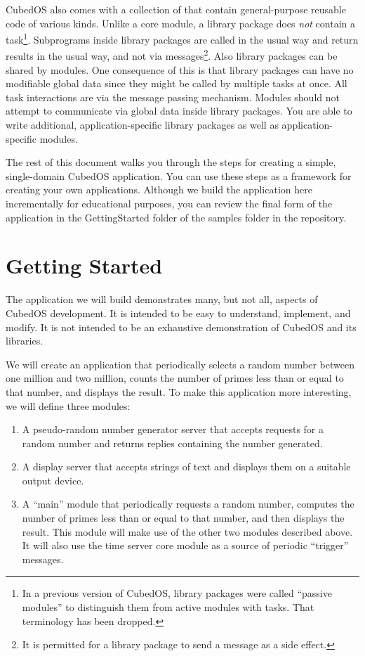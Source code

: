 \documentclass{scrreprt}
\begin{document}
CubedOS also comes with a collection of  that contain general-purpose reusable code of various kinds. Unlike a core module, a library package does \emph{not} contain a task\footnote{In a previous version of CubedOS, library packages were called ``passive modules'' to distinguish them from active modules with tasks. That terminology has been dropped.}. Subprograms inside library packages are called in the usual way and return results in the usual way, and not via messages\footnote{It is permitted for a library package to send a message as a side effect.}. Also library packages can be shared by modules. One consequence of this is that library packages can have no modifiable global data since they might be called by multiple tasks at once. All task interactions are via the message passing mechanism. Modules should not attempt to communicate via global data inside library packages. You are able to write additional, application-specific library packages as well as application-specific modules.

The rest of this document walks you through the steps for creating a simple, single-domain CubedOS application. You can use these steps as a framework for creating your own applications. Although we build the application here incrementally for educational purposes, you can review the final form of the application in the GettingStarted folder of the samples folder in the repository. 

\chapter{Getting Started}

The application we will build demonstrates many, but not all, aspects of CubedOS development. It is intended to be easy to understand, implement, and modify. It is not intended to be an exhaustive demonstration of CubedOS and its libraries.

We will create an application that periodically selects a random number between one million and two million, counts the number of primes less than or equal to that number, and displays the result. To make this application more interesting, we will define three modules:
\begin{enumerate}
    \item A pseudo-random number generator server that accepts requests for a random number and returns replies containing the number generated.
    \item A display server that accepts strings of text and displays them on a suitable output device.
    \item A ``main'' module that periodically requests a random number, computes the number of primes less than or equal to that number, and then displays the result. This module will make use of the other two modules described above. It will also use the time server core module as a source of periodic ``trigger'' messages.
\end{enumerate}
\end{document}
